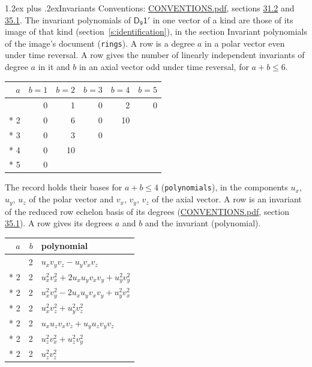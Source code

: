\documentclass[10pt,a4paper]{article}
\makeatletter
\renewcommand\section{\@startsection{section}{1}{\z@}{-3ex plus -1ex minus -.2ex}%
  {1.2ex plus .2ex}{\normalfont\large\sffamily\bfseries\color{parttitle}}}
\numberwithin{equation}{section}
\newcommand{\grp}[1]{\mathsf{#1}}
\makeatother
\begin{document}
\section{Invariants}\label{s:invariants}
Conventions: \href{../../CONVENTIONS.pdf}{CONVENTIONS.pdf}, sections \href{../../CONVENTIONS.pdf\#conv.31.2}{31.2} and \href{../../CONVENTIONS.pdf\#conv.35.1}{35.1}.
The invariant polynomials of $\grp{D_{9}1'}$ in one vector of a kind are those of its image of that kind (section~\ref{s:identification}), in the section Invariant polynomials of the image's document (\texttt{rings}).
\leavevmode\label{n:index.degree.polar}\label{n:index.degree.axial}A row is a degree $a$ in a polar vector even under time reversal. A row gives the number of linearly independent invariants of degree $a$ in it and $b$ in an axial vector odd under time reversal, for $a + b \le 6$.
{\small\begin{longtable}{@{}rrrrrr@{}}\toprule
$a$ & $b = 1$ & $b = 2$ & $b = 3$ & $b = 4$ & $b = 5$\\\midrule\endhead
\bottomrule\endfoot\endlastfoot
1 & 0 & 1 & 0 & 2 & 0\\*
2 & 0 & 6 & 0 & 10 & \\*
3 & 0 & 3 & 0 &  & \\*
4 & 0 & 10 &  &  & \\*
5 & 0 &  &  &  & \\
\bottomrule\end{longtable}}
\leavevmode\label{n:local.component.polar}\label{n:local.component.axial}The record holds their bases for $a + b \le 4$ (\texttt{polynomials}), in the components $u_{x}$, $u_{y}$, $u_{z}$ of the polar vector and $v_{x}$, $v_{y}$, $v_{z}$ of the axial vector. \label{n:head.polynomial}A row is an invariant of the reduced row echelon basis of its degrees (\href{../../CONVENTIONS.pdf}{CONVENTIONS.pdf}, section \href{../../CONVENTIONS.pdf\#conv.35.1}{35.1}). A row gives its degrees $a$ and $b$ and the invariant (polynomial).
{\small\renewcommand{\arraystretch}{1.2}\begin{longtable}{@{}rrl@{}}\toprule
$a$ & $b$ & polynomial\\\midrule\endhead
\bottomrule\endfoot\endlastfoot
1 & 2 & $u_{x}v_{y}v_{z} - u_{y}v_{x}v_{z}$\\*
2 & 2 & $u_{x}^{2}v_{x}^{2} + 2u_{x}u_{y}v_{x}v_{y} + u_{y}^{2}v_{y}^{2}$\\*
2 & 2 & $u_{x}^{2}v_{y}^{2} - 2u_{x}u_{y}v_{x}v_{y} + u_{y}^{2}v_{x}^{2}$\\*
2 & 2 & $u_{x}^{2}v_{z}^{2} + u_{y}^{2}v_{z}^{2}$\\*
2 & 2 & $u_{x}u_{z}v_{x}v_{z} + u_{y}u_{z}v_{y}v_{z}$\\*
2 & 2 & $u_{z}^{2}v_{x}^{2} + u_{z}^{2}v_{y}^{2}$\\*
2 & 2 & $u_{z}^{2}v_{z}^{2}$\\
\bottomrule\end{longtable}}
\end{document}

